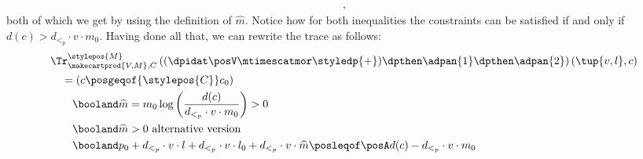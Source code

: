 {\begin{example}
\begin{align}
    ,\end{align}
    both of which we get by using the definition of $\widehat{m}$. Notice how for both inequalities the constraints can be satisfied if and only if $d(c) > d_{<_p}\cdot v \cdot m_0$. Having done all that, we can rewrite the trace as follows:
    \begin{align*}
        &\Tr_{\makecartprod{V,M}, C}^{\stylepos{M}}\left((\dpidat\posV \mtimescatmor \styledp{+})\dpthen \adpan{1} \dpthen \adpan{2}\right)\left(\tup{v, l}, c\right)  \notag \\
        & \quad = (c \posgeqof{\stylepos{C}} c_0) \notag\\
        & \qquad \booland\widehat{m} = m_0 \log \left(\frac{d(c)}{d_{<_p} \cdot v \cdot m_0}\right) > 0 \notag\\
        & \qquad \booland \widehat{m} > 0 \text{ alternative version} \notag\\
        & \qquad \booland p_0 + d_{<_p} \cdot v \cdot l + d_{<_p} \cdot v \cdot l_0 + d_{<_p} \cdot v \cdot \widehat{m} \posleqof\posA d(c) - d_{<_p} \cdot v \cdot m_0
    \end{align*}
\end{example}
}
